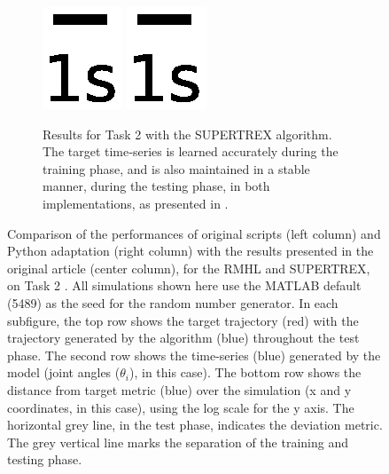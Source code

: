 \begin{figure}
\begin{subfigure}{\textwidth}
\begin{subfigure}{\textwidth}
        \end{subfigure}
        

        
        
        \includegraphics[trim=2cm 6cm 2cm 6cm, clip=true,height=0.05\linewidth,width=.4\linewidth]{Figures/Fig_T1/Python/ST_T1_Scale.eps}
        \includegraphics[trim=2cm 4cm 2cm 6cm, clip=true,height=0.05\linewidth,width=.45\linewidth]{Figures/Fig_T1/Python/ST_T1_Scale.eps}
        
        
    \caption{Results for Task 2 with the SUPERTREX algorithm. The target time‐series is learned accurately during the training phase, and is also maintained in a stable manner, during the testing phase, in both implementations, as presented in \cite{pyle2019}.}
    \label{Fig:compTask2ST}
    
    \end{subfigure}


\caption{Comparison of the performances of original scripts (left column) and Python adaptation (right column) with the results presented in the original article (center column), for the RMHL and SUPERTREX, on Task 2 \cite{pyle2019}. All simulations shown here use the MATLAB default (5489) as the seed for the random number generator. In each subfigure, the top row shows the target trajectory (red) with the trajectory generated by the algorithm (blue) throughout the test phase. The second row shows the time-series (blue) generated by the model (joint angles ($\theta_i$), in this case). The bottom row shows the distance from target metric (blue) over the simulation (x and y coordinates, in this case), using the log scale for the y axis. The horizontal grey line, in the test phase, indicates the deviation metric. The grey vertical line marks the separation of the training and testing phase.}
\label{Fig:Comparison_Task2}

\end{figure}